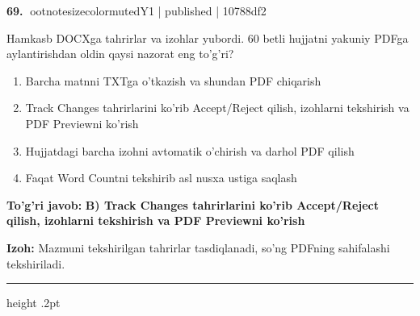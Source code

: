 \documentclass[10pt,a4paper]{article}
\begin{document}
\textbf{\color{ink}69.} {ootnotesizecolor{muted}Y1 | published | 10788df2}
\par
Hamkasb DOCXga tahrirlar va izohlar yubordi. 60 betli hujjatni yakuniy PDFga aylantirishdan oldin qaysi nazorat eng to'g'ri?
\begin{enumerate}[label=\Alph*),leftmargin=9mm]
\item Barcha matnni TXTga o'tkazish va shundan PDF chiqarish
\item Track Changes tahrirlarini ko'rib Accept/Reject qilish, izohlarni tekshirish va PDF Previewni ko'rish
\item Hujjatdagi barcha izohni avtomatik o'chirish va darhol PDF qilish
\item Faqat Word Countni tekshirib asl nusxa ustiga saqlash
\end{enumerate}
\begin{tcolorbox}[enhanced,breakable,colback=teal!4,colframe=teal!55!black,boxrule=0.45pt,arc=1.2mm,left=2.8mm,right=2.8mm,top=2mm,bottom=2mm]
\textbf{\color{teal}To'g'ri javob:} \textbf{B) Track Changes tahrirlarini ko'rib Accept/Reject qilish, izohlarni tekshirish va PDF Previewni ko'rish}
\par\smallskip
\textbf{Izoh:} Mazmuni tekshirilgan tahrirlar tasdiqlanadi, so'ng PDFning sahifalashi tekshiriladi.
\end{tcolorbox}
\vspace{2mm}\hrule height .2pt\vspace{2mm}
\end{document}
